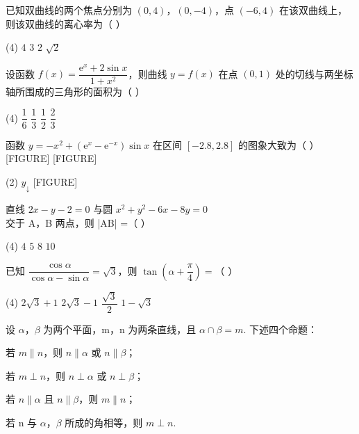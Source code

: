 \documentclass[UTF8,12pt]{ctexart}
\begin{document}
\begin{questions}
  \item 已知双曲线的两个焦点分别为 $(0,4)$，$(0,-4)$，点 $(-6,4)$ 在该双曲线上，
    则该双曲线的离心率为（ ）

    \begin{tasks}(4)
      \task $4$
      \task $3$
      \task $2$
      \task $\sqrt2$
    \end{tasks}

  \item 设函数 $f(x)=\dfrac{\mathrm{e}^x+2\sin x}{1+x^2}$，则曲线 $y=f(x)$ 在点 $(0,1)$
    处的切线与两坐标轴所围成的三角形的面积为（ ）

    \begin{tasks}(4)
      \task $\dfrac16$
      \task $\dfrac13$
      \task $\dfrac12$
      \task $\dfrac23$
    \end{tasks}

  \setcounter{questionsi}{2}
  \item 函数 $y=-x^2+(\mathrm{e}^x-\mathrm{e}^{-x})\sin x$ 在区间 $[-2.8,2.8]$
    的图象大致为（ ）
  [FIGURE]
  [FIGURE]

    \begin{tasks}(2)
      \task
      \task $y_\downarrow$ [FIGURE]
      \task [FIGURE]
    \end{tasks}

  \setcounter{questionsi}{8}
  \item 直线 $2x - y-2=0$ 与圆 $x^2+y^2-6x-8y=0$ 交于 A，B 两点，则 |AB| =（ ）

    \begin{tasks}(4)
      \task $4$
      \task $5$
      \task $8$
      \task $10$
    \end{tasks}

  \item 已知 $\dfrac{\cos\alpha}{\cos\alpha-\sin\alpha}=\sqrt3$，则
    $\tan\left(\alpha+\dfrac\pi4\right)=$（ ）

    \begin{tasks}(4)
      \task $2\sqrt3+1$
      \task $2\sqrt3-1$
      \task $\dfrac{\sqrt3}{2}$
      \task $1-\sqrt3$
    \end{tasks}

  \item 设 $\alpha$，$\beta$ 为两个平面，m，n 为两条直线，且 $\alpha\cap\beta=m$.
    下述四个命题：

    \begin{statements}
      \item[①] 若 $m\parallel n$，则 $n\parallel\alpha$ 或 $n\parallel\beta$；
      \item[②] 若 $m\perp n$，则 $n\perp\alpha$ 或 $n\perp\beta$；
      \item[③] 若 $n\parallel\alpha$ 且 $n\parallel\beta$，则 $m\parallel n$；
      \item[④] 若 n 与 $\alpha$，$\beta$ 所成的角相等，则 $m\perp n$.
    \end{statements}


\end{questions}
\end{document}
